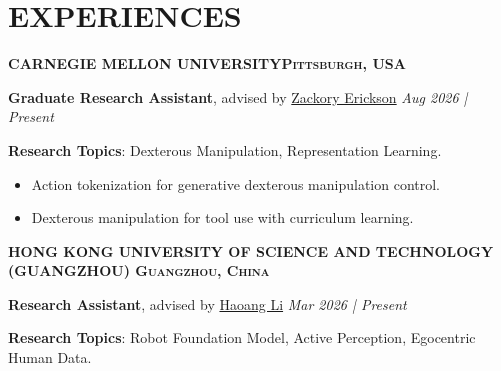 \documentclass[a4paper,9pt]{extarticle}
\begin{document}
\section*{{\textbf{\fontsize{14pt}{8pt}\selectfont E}\textbf{\scshape XPERIENCES}}}
\vspace{-0.10in}
{\textbf{\fontsize{12pt}{4pt}\selectfont C}\textbf{\scshape ARNEGIE MELLON UNIVERSITY\hfill Pittsburgh, USA}}
\par \textbf{Graduate Research Assistant}, advised by \href{https://zackory.com/}{Zackory Erickson} \hfill \textit{Aug 2026 | Present}
\par \textbf{Research Topics}: Dexterous Manipulation, Representation Learning. %
\vspace{-0.05in}
\begin{itemize}
    \item Action tokenization for generative dexterous manipulation control.
    \item Dexterous manipulation for tool use with curriculum learning.
\end{itemize}
\vspace{-0.02in}
{\textbf{\fontsize{12pt}{4pt}\selectfont H}\textbf{\scshape ONG KONG UNIVERSITY OF SCIENCE AND TECHNOLOGY (GUANGZHOU) \hfill Guangzhou, China}}
\par \textbf{Research Assistant}, advised by \href{https://sites.google.com/view/haoangli/homepage}{Haoang Li}  \hfill \textit{Mar 2026 | Present}
\par\textbf{Research Topics}: Robot Foundation Model, Active Perception, Egocentric Human Data.%
\vspace{-0.05in}
\end{document}
